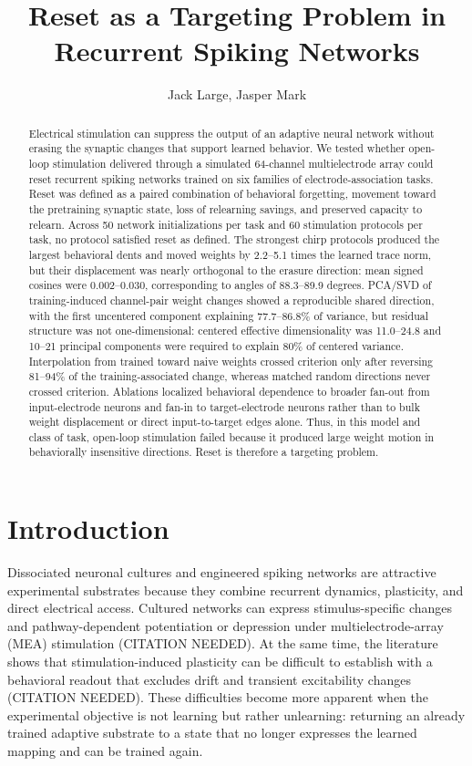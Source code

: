 \documentclass{article}
\title{Reset as a Targeting Problem in Recurrent Spiking Networks}
\author{Jack Large, Jasper Mark}
\begin{document}
\maketitle

\begin{abstract}
Electrical stimulation can suppress the output of an adaptive neural network without erasing the synaptic changes that support learned behavior. We tested whether open-loop stimulation delivered through a simulated 64-channel multielectrode array could reset recurrent spiking networks trained on six families of electrode-association tasks. Reset was defined as a paired combination of behavioral forgetting, movement toward the pretraining synaptic state, loss of relearning savings, and preserved capacity to relearn. Across 50 network initializations per task and 60 stimulation protocols per task, no protocol satisfied reset as defined. The strongest chirp protocols produced the largest behavioral dents and moved weights by 2.2--5.1 times the learned trace norm, but their displacement was nearly orthogonal to the erasure direction: mean signed cosines were 0.002--0.030, corresponding to angles of 88.3--89.9 degrees. PCA/SVD of training-induced channel-pair weight changes showed a reproducible shared direction, with the first uncentered component explaining 77.7--86.8\% of variance, but residual structure was not one-dimensional: centered effective dimensionality was 11.0--24.8 and 10--21 principal components were required to explain 80\% of centered variance. Interpolation from trained toward naive weights crossed criterion only after reversing 81--94\% of the training-associated change, whereas matched random directions never crossed criterion. Ablations localized behavioral dependence to broader fan-out from input-electrode neurons and fan-in to target-electrode neurons rather than to bulk weight displacement or direct input-to-target edges alone. Thus, in this model and class of task, open-loop stimulation failed because it produced large weight motion in behaviorally insensitive directions. Reset is therefore a targeting problem.
\end{abstract}

\section{Introduction}

Dissociated neuronal cultures and engineered spiking networks are attractive experimental substrates because they combine recurrent dynamics, plasticity, and direct electrical access. Cultured networks can express stimulus-specific changes and pathway-dependent potentiation or depression under multielectrode-array (MEA) stimulation (CITATION NEEDED). At the same time, the literature shows that stimulation-induced plasticity can be difficult to establish with a behavioral readout that excludes drift and transient excitability changes (CITATION NEEDED). These difficulties become more apparent when the experimental objective is not learning but rather unlearning: returning an already trained adaptive substrate to a state that no longer expresses the learned mapping and can be trained again.
\end{document}
